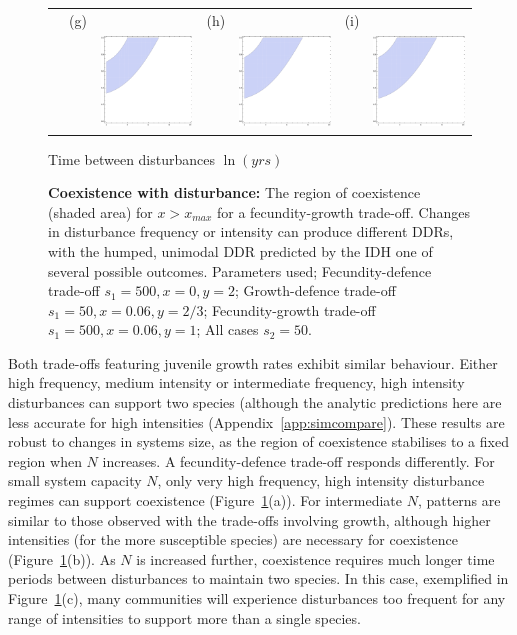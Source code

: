 \documentclass[a4paper]{article}
\begin{document}
\begin{figure}[th]
\begin{tabular}{lcccccc}
 &(g)&&(h)&&(i)&\\
 && \includegraphics[width=1.5in]{fgtoimageexp3.pdf} && \includegraphics[width=1.5in]{fgtoimageexp7.pdf} && \includegraphics[width=1.5in]{fgtoimageexp15.pdf} \\
 \end{tabular}
 Time between disturbances $\ln(yrs)$
   \caption{\textbf{Coexistence with disturbance: }The region of coexistence (shaded area) for $x>x_{max}$ for a fecundity-growth trade-off. Changes in disturbance frequency or intensity can produce different DDRs, with the humped, unimodal DDR predicted by the IDH one of several possible outcomes. Parameters used; Fecundity-defence trade-off $s_1=500,x=0,y=2$; Growth-defence trade-off $s_1=50,x=0.06,y=2/3$; Fecundity-growth trade-off $s_1=500,x=0.06,y=1$; All cases $s_2=50$.}
 \label{fig:FvIwithN}
\end{figure}
Both trade-offs featuring juvenile growth rates exhibit similar behaviour. Either high frequency, medium intensity or intermediate frequency, high intensity disturbances can support two species (although the analytic predictions here are less accurate for high intensities (Appendix~\ref{app:simcompare}). These results are robust to changes in systems size, as the region of coexistence stabilises to a fixed region when $N$ increases. A fecundity-defence trade-off responds differently. For small system capacity $N$, only very high frequency, high intensity disturbance regimes can support coexistence (Figure~\ref{fig:FvIwithN}(a)). For intermediate $N$, patterns are similar to those observed with the trade-offs involving growth, although higher intensities (for the more susceptible species) are necessary for coexistence (Figure~\ref{fig:FvIwithN}(b)). As $N$ is increased further, coexistence requires much longer time periods between disturbances to maintain two species. In this case, exemplified in Figure~\ref{fig:FvIwithN}(c), many communities will experience disturbances too frequent for any range of intensities to support more than a single species.
\end{document}
